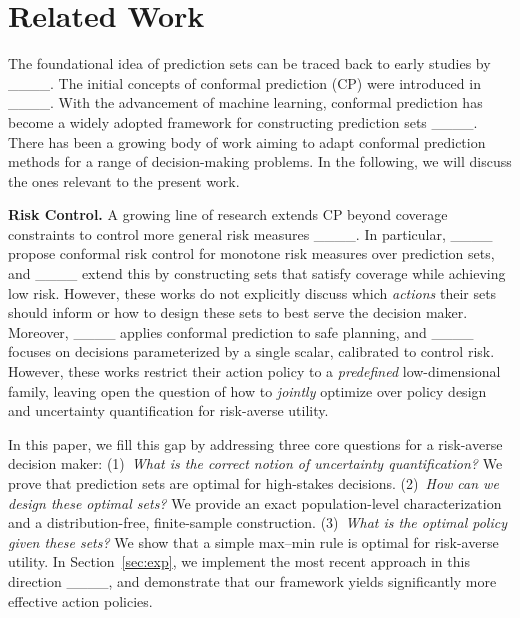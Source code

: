 \section{Related Work}
The foundational idea of prediction sets can be traced back to early studies by ____. The initial concepts of conformal prediction (CP) were introduced in ____. With the advancement of machine learning, conformal prediction has become a widely adopted framework for constructing prediction sets ____. There has been a growing body of work aiming to adapt conformal prediction methods for a range of decision-making problems. In the following, we will discuss the ones relevant to the present work. 

 

\textbf{Risk Control.} A growing line of research extends CP beyond coverage constraints to control more general risk measures ____. In particular, ____ propose conformal risk control for monotone risk measures over prediction sets, and ____ extend this by constructing sets that satisfy coverage while achieving low risk. However,  these works  do not explicitly discuss which \emph{actions} their sets should inform or how to design these sets to best serve the decision maker.  Moreover, ____ applies conformal prediction to safe planning, and  ____ focuses on decisions parameterized by a single scalar, calibrated to control risk. However,  these works restrict their action policy to a \emph{predefined} low-dimensional family, leaving open the question of how to \emph{jointly} optimize over policy design and uncertainty quantification for risk-averse utility. 

In this paper, we fill this gap by addressing three core questions for a risk-averse decision maker: (1)~\emph{What is the correct notion of uncertainty quantification?} We prove that prediction sets are optimal for high-stakes decisions. (2)~\emph{How can we design these optimal sets?} We provide an exact population-level characterization and a distribution-free, finite-sample construction. (3)~\emph{What is the optimal policy given these sets?} We show that a simple max--min rule is optimal for risk-averse utility. In Section~\ref{sec:exp}, we  implement the most recent
approach in this direction ____, and demonstrate that our framework yields significantly more effective action policies.

